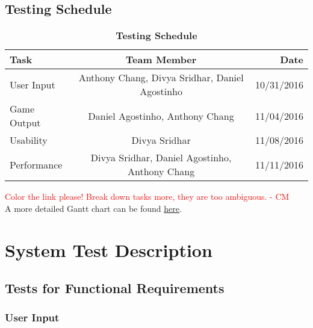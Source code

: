 \documentclass[12pt, titlepage]{article}
\begin{document}
\subsection{Testing Schedule}
\begin{table}[!htbp]
\centering
\caption{\bf Testing Schedule}
\label{Table}	

\begin{tabular}[pos]{|l|c|r|}
\hline
\color{red}\textbf{Task}& \color{red}\textbf{Team Member} & \color{red}\textbf{Date} \\ \hline
User Input & Anthony Chang, Divya Sridhar, Daniel Agostinho & 10/31/2016\\ \hline
Game Output &  Daniel Agostinho, Anthony Chang & 11/04/2016\\ \hline
Usability & Divya Sridhar & 11/08/2016\\ \hline
Performance & Divya Sridhar, Daniel Agostinho, Anthony Chang & 11/11/2016\\ \hline 
		
\end{tabular}
\end{table}		
\textcolor{red}{Color the link please! Break down tasks more, they are too ambiguous.  - CM} \\
A more detailed Gantt chart can be found \href{run:./Team11_gantt.gan}{here}.

\section{System Test Description}
\subsection{Tests for Functional Requirements}
\subsubsection{User Input}
\end{document}
